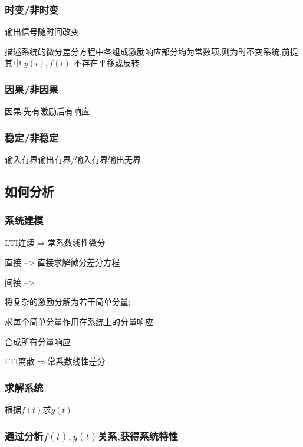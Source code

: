 \documentclass{article}
\begin{document}
    \subsubsection{时变/非时变}%
    输出信号随时间改变

    描述系统的微分差分方程中各组成激励响应部分均为常数项,则为时不变系统,前提其中 $y(t),f(t)$ 不存在平移或反转

    \subsubsection{因果/非因果}%
    因果:先有激励后有响应
    \subsubsection{稳定/非稳定}%
    输入有界输出有界/输入有界输出无界

    \subsection{如何分析}%
    \subsubsection{系统建模}%
    LTI连续$\Longrightarrow$常系数线性微分

    直接  -->  直接求解微分差分方程

    间接  -->  

    将复杂的激励分解为若干简单分量;

    求每个简单分量作用在系统上的分量响应

    合成所有分量响应

    LTI离散$\Longrightarrow$常系数线性差分
    \subsubsection*{求解系统}%
    根据$f(t)$求$y(t)$
    \subsubsection{通过分析$f(t),y(t)$关系,获得系统特性}%

    
\end{document}
